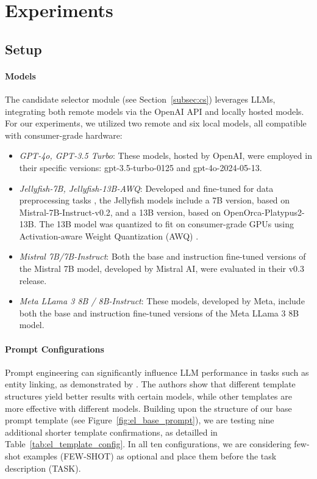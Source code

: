 
\section{Experiments}
\label{sec:experiments}

\subsection{Setup}

\paragraph{Models} The candidate selector module (see Section~\ref{subsec:cs}) leverages LLMs, integrating both remote models via the OpenAI API and locally hosted models. For our experiments, we utilized two remote and six local models, all compatible with consumer-grade hardware:

\begin{itemize}

    \item \emph{GPT-4o, GPT-3.5 Turbo}: These models, hosted by OpenAI, were employed in their specific versions: gpt-3.5-turbo-0125 and gpt-4o-2024-05-13.

    \item \emph{Jellyfish-7B, Jellyfish-13B-AWQ}: Developed and fine-tuned for data preprocessing tasks \cite{Zhang2024}, the Jellyfish models include a 7B version, based on Mistral-7B-Instruct-v0.2, and a 13B version, based on OpenOrca-Platypus2-13B. The 13B model was quantized to fit on consumer-grade GPUs using Activation-aware Weight Quantization (AWQ) \cite{Lin2024}.

    \item \emph{Mistral 7B/7B-Instruct}: Both the base and instruction fine-tuned versions of the Mistral 7B model, developed by Mistral AI, were evaluated in their v0.3 release.

    \item \emph{Meta LLama 3 8B / 8B-Instruct}: These models, developed by Meta, include both the base and instruction fine-tuned versions of the Meta LLama 3 8B model.

\end{itemize}

\paragraph{Prompt Configurations} Prompt engineering can significantly influence LLM performance in tasks such as entity linking, as demonstrated by \cite{Peeters2024}. The authors show that different template structures yield better results with certain models, while other templates are more effective with different models. Building upon the structure of our base prompt template (see Figure~\ref{fig:el_base_prompt}), we are testing nine additional shorter template confirmations, as detailled in Table~\ref{tab:el_template_config}. In all ten configurations, we are considering few-shot examples (FEW-SHOT) as optional and place them before the task description (TASK).

